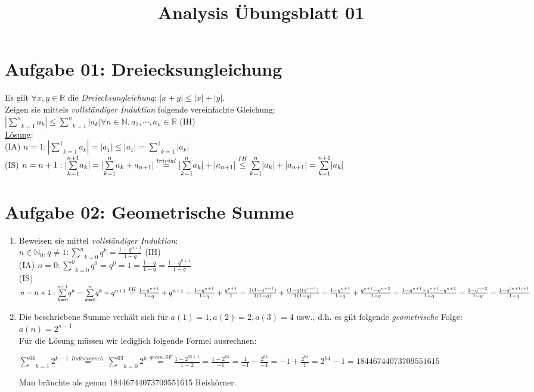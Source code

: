 \documentclass[a4paper,11pt]{article}
\title{Analysis Übungsblatt 01}
\begin{document}
\maketitle

\section{Aufgabe 01: Dreiecksungleichung}
Es gilt $\forall x,y\in\mathbb{R}$ die \emph{Dreiecksungleichung}: $|x+y|\leq|x|+|y|$.\\
Zeigen sie mittels \emph{vollständiger Induktion} folgende vereinfachte Gleichung:\\
$|\underset{k=1}{\overset{n}{\sum}}a_k|\leq\underset{k=1}{\overset{n}{\sum}}|a_k|\forall n\in\mathbb{N},a_1,\cdots,a_n\in\mathbb{R}$ (IH)\\
\underline{Lösung}:\\
(IA) $n=1: |\underset{k=1}{\overset{1}{\sum}}a_k|=|a_1|\leq|a_1|=\underset{k=1}{\overset{1}{\sum}}|a_k|$\\
(IS) $n=n+1:|\underset{k=1}{\overset{n+1}{\sum}}a_k|=|\underset{k=1}{\overset{n}{\sum}}a_k+a_{n+1}|\overset{trivial}{=}|\underset{k=1}{\overset{n}{\sum}}a_k|+|a_{n+1}|\\
\overset{IH}{\leq}\underset{k=1}{\overset{n}{\sum}}|a_k|+|a_{n+1}|=\underset{k=1}{\overset{n+1}{\sum}}|a_k|$
\section{Aufgabe 02: Geometrische Summe}
\begin{enumerate}[label={\alph*)}]
	\item Beweisen sie mittel \emph{vollständiger Induktion}:\\
		$n\in\mathbb{N}_0,q\neq1:\underset{k=0}{\overset{n}{\sum}}q^k=\frac{1-q^{n+1}}{1-q}$ (IH)\\
		(IA) $n=0:\underset{k=0}{\overset{0}{\sum}}q^0=q^0=1=\frac{1-q}{1-q}=\frac{1-q^{0+1}}{1-q}$\\
		(IS) $n=n+1:\underset{k=0}{\overset{n+1}{\sum}}q^k=\underset{k=0}{\overset{n}{\sum}}q^k+q^{n+1}\overset{IH}{=}\frac{1-q^{n+1}}{1-q}+q^{n+1}\\
		=\frac{1-q^{n+1}}{1-q}+\frac{q^{n+1}}{1}=\frac{1(1-q^{n+1})}{1(1-q)}+\frac{(1-q)(q^{n+1})}{1(1-q)}\\
		=\frac{1-q^{n+1}}{1-q}+\frac{q^{n+1}-q^{n+2}}{1-q}=\frac{1-q^{n+1}+q^{n+1}-q^{n+2}}{1-q}=\frac{1-q^{n+2}}{1-q}=\frac{1-q^{(n+1)+1}}{1-q}$
	\item Die beschriebene Summe verhält sich für $a(1)=1, a(2)=2, a(3)=4$ usw., d.h. es gilt folgende \emph{geometrische} Folge: $a(n)=2^{n-1}$\\
		Für die Lösung müssen wir lediglich folgende Formel ausrechnen:

		$\underset{k=1}{\overset{64}{\sum}}2^{k-1}\overset{Indexversch.}{=}\underset{k=0}{\overset{63}{\sum}}2^k\overset{geom. SF}{=}\frac{1-2^{63+1}}{1-2}=\frac{1-2^{64}}{-1}=\frac{1}{-1}-\frac{2^{64}}{-1}= -1+\frac{2^{64}}{1}=2^{64}-1=18446744073709551615$

		Man bräuchte als genau 18446744073709551615 Reiskörner.
\end{enumerate}
\end{document}
